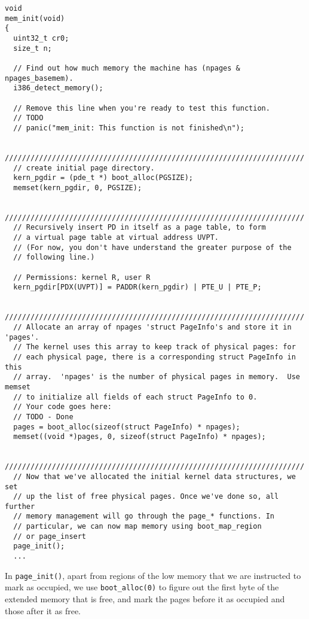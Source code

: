 \documentclass[]{article}
\begin{document}
\begin{verbatim}
void
mem_init(void)
{
  uint32_t cr0;
  size_t n;

  // Find out how much memory the machine has (npages & npages_basemem).
  i386_detect_memory();

  // Remove this line when you're ready to test this function.
  // TODO
  // panic("mem_init: This function is not finished\n");

  //////////////////////////////////////////////////////////////////////
  // create initial page directory.
  kern_pgdir = (pde_t *) boot_alloc(PGSIZE);
  memset(kern_pgdir, 0, PGSIZE);

  //////////////////////////////////////////////////////////////////////
  // Recursively insert PD in itself as a page table, to form
  // a virtual page table at virtual address UVPT.
  // (For now, you don't have understand the greater purpose of the
  // following line.)

  // Permissions: kernel R, user R
  kern_pgdir[PDX(UVPT)] = PADDR(kern_pgdir) | PTE_U | PTE_P;

  //////////////////////////////////////////////////////////////////////
  // Allocate an array of npages 'struct PageInfo's and store it in 'pages'.
  // The kernel uses this array to keep track of physical pages: for
  // each physical page, there is a corresponding struct PageInfo in this
  // array.  'npages' is the number of physical pages in memory.  Use memset
  // to initialize all fields of each struct PageInfo to 0.
  // Your code goes here:
  // TODO - Done
  pages = boot_alloc(sizeof(struct PageInfo) * npages);
  memset((void *)pages, 0, sizeof(struct PageInfo) * npages);

  //////////////////////////////////////////////////////////////////////
  // Now that we've allocated the initial kernel data structures, we set
  // up the list of free physical pages. Once we've done so, all further
  // memory management will go through the page_* functions. In
  // particular, we can now map memory using boot_map_region
  // or page_insert
  page_init();
  ...
\end{verbatim}

In \verb|page_init()|, apart from regions of the low memory that we are instructed to mark as occupied, we use \verb|boot_alloc(0)| to figure out the first byte of the extended memory that is free, and mark the pages before it as occupied and those after it as free.
\end{document}
